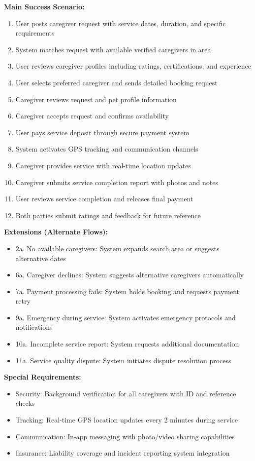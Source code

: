 \textbf{Main Success Scenario:}
\begin{enumerate}
    \item User posts caregiver request with service dates, duration, and specific requirements
    \item System matches request with available verified caregivers in area
    \item User reviews caregiver profiles including ratings, certifications, and experience
    \item User selects preferred caregiver and sends detailed booking request
    \item Caregiver reviews request and pet profile information
    \item Caregiver accepts request and confirms availability
    \item User pays service deposit through secure payment system
    \item System activates GPS tracking and communication channels
    \item Caregiver provides service with real-time location updates
    \item Caregiver submits service completion report with photos and notes
    \item User reviews service completion and releases final payment
    \item Both parties submit ratings and feedback for future reference
\end{enumerate}

\textbf{Extensions (Alternate Flows):}
\begin{itemize}
    \item 2a. No available caregivers: System expands search area or suggests alternative dates
    \item 6a. Caregiver declines: System suggests alternative caregivers automatically
    \item 7a. Payment processing fails: System holds booking and requests payment retry
    \item 9a. Emergency during service: System activates emergency protocols and notifications
    \item 10a. Incomplete service report: System requests additional documentation
    \item 11a. Service quality dispute: System initiates dispute resolution process
\end{itemize}

\textbf{Special Requirements:}
\begin{itemize}
    \item Security: Background verification for all caregivers with ID and reference checks
    \item Tracking: Real-time GPS location updates every 2 minutes during service
    \item Communication: In-app messaging with photo/video sharing capabilities
    \item Insurance: Liability coverage and incident reporting system integration
\end{itemize}

